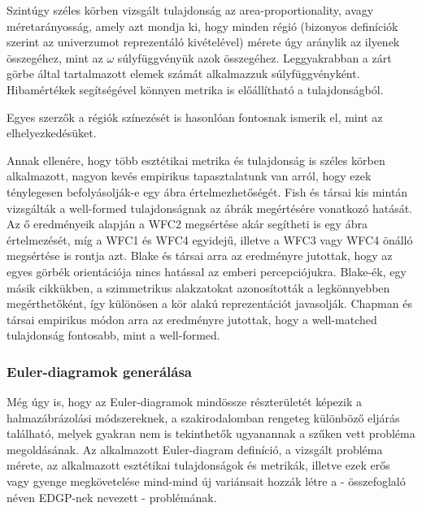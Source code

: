 Szintúgy széles körben vizsgált tulajdonság az area-proportionality, avagy méretarányosság\cite{euler_with_circles, area_proportional_phd, drawing_area_proportional, general_area_proportional}, amely azt mondja ki, hogy minden régió (bizonyos definíciók szerint az univerzumot reprezentáló kivételével) mérete úgy aránylik az ilyenek összegéhez, mint az $\omega$ súlyfüggvényük azok összegéhez. Leggyakrabban a zárt görbe által tartalmazott elemek számát alkalmazzuk súlyfüggvényként. Hibamértékek segítségével könnyen metrika is előállítható a tulajdonságból.


Egyes szerzők a régiók színezését is hasonlóan fontosnak ismerik el, mint az elhelyezkedésüket\cite{imdb_euler, how_color_euler}.


Annak ellenére, hogy több esztétikai metrika és tulajdonság is széles körben alkalmazott, nagyon kevés empirikus tapasztalatunk van arról, hogy ezek ténylegesen befolyásolják-e egy ábra értelmezhetőségét. Fish és társai kis mintán vizsgálták\cite{euler_comprehension} a well-formed tulajdonságnak az ábrák megértésére vonatkozó hatását. Az ő eredményeik alapján a WFC2 megsértése akár segítheti is egy ábra értelmezését, míg a WFC1 és WFC4 egyidejű, illetve a WFC3 vagy WFC4 önálló megsértése is rontja azt. Blake és társai\cite{orientation_comprehension} arra az eredményre jutottak, hogy az egyes görbék orientációja nincs hatással az emberi percepciójukra. Blake-ék, egy másik cikkükben\cite{shape_comprehension}, a szimmetrikus alakzatokat azonosították a legkönnyebben megérthetőként, így különösen a kör alakú reprezentációt javasolják. Chapman és társai empirikus módon arra az eredményre jutottak\cite{wellmatched_important}, hogy a well-matched tulajdonság fontosabb, mint a well-formed.

\subsubsection{Euler-diagramok generálása}

Még úgy is, hogy az Euler-diagramok mindössze részterületét képezik a halmazábrázolási módszereknek, a szakirodalomban rengeteg különböző eljárás található, melyek gyakran nem is tekinthetők ugyanannak a szűken vett probléma megoldásának. Az alkalmazott Euler-diagram definíció, a vizsgált probléma mérete, az alkalmazott esztétikai tulajdonságok és metrikák, illetve ezek erős vagy gyenge megkövetelése mind-mind új variánsait hozzák létre a - összefoglaló néven EDGP-nek nevezett - problémának.

